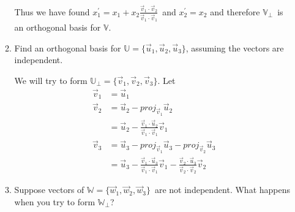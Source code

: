 \documentclass{letter}
\newcommand{\Vn}[1]{\vec{#1}}
\newcommand{\?}{\stackrel{?}{=}}
\newcommand\Que[1]{%
   \leavevmode\noindent
   #1
}
\newcommand\Ans[2][]{%
   \leavevmode\noindent
   {
       \begin{mdframed}[backgroundcolor=blue!10]
       #2
       \end{mdframed}
   }
}
\begin{document}
\begin{enumerate}
\begin{enumerate}[label=(\alph*)]
{\begin{align*}
        \end{align*}
        Thus we have found $x_1^\prime = x_1+x_2\frac{\Vn{v}_1\cdot\Vn{v}_2}{\Vn{v}_1\cdot\Vn{v}_1}$\ and $x_2^\prime=x_2$ and therefore $\mathbb{V}_\perp$\ is an orthogonal basis for $\mathbb{V}$.
    }
    \item \Que{
        Find an orthogonal basis for $\mathbb{U}=\{\Vn{u}_1,\Vn{u}_2,\Vn{u}_3\}$, assuming the vectors are independent.
    }
    \Ans{
        We will try to form $\mathbb{U}_\perp = \{\Vn{v}_{1},\Vn{v}_{2},\Vn{v}_{3}\}$. Let
        \begin{align*}
            \Vn{v}_1 &= \Vn{u}_1 \\
            \Vn{v}_2 &= \Vn{u}_2 - proj_{\Vn{v}_{1}}\Vn{u}_2 \\
                            &= \Vn{u}_2 - \frac{\Vn{v}_1\cdot\Vn{u}_2}{\Vn{v}_1\cdot\Vn{v}_1}\Vn{v}_1 \\
            \Vn{v}_3 &= \Vn{u}_3 - proj_{\Vn{v}_1}\Vn{u}_3 - proj_{\Vn{v}_2}\Vn{u}_3\\
                     &= \Vn{u}_3 - \frac{\Vn{v}_1\cdot\Vn{u}_3}{\Vn{v}_1\cdot\Vn{v}_1}\Vn{v}_1 - 
                                   \frac{\Vn{v}_2\cdot\Vn{u}_3}{\Vn{v}_2\cdot\Vn{v}_2}\Vn{v}_2
        \end{align*}
    }
    \item 
        Suppose vectors of $\mathbb{W}=\{\Vn{w}_1,\Vn{w}_2,\Vn{w}_3\}$\ are not independent.  What happens when you try to form $\mathbb{W}_\perp$?
    

\end{enumerate}
\end{enumerate}
\end{document}
